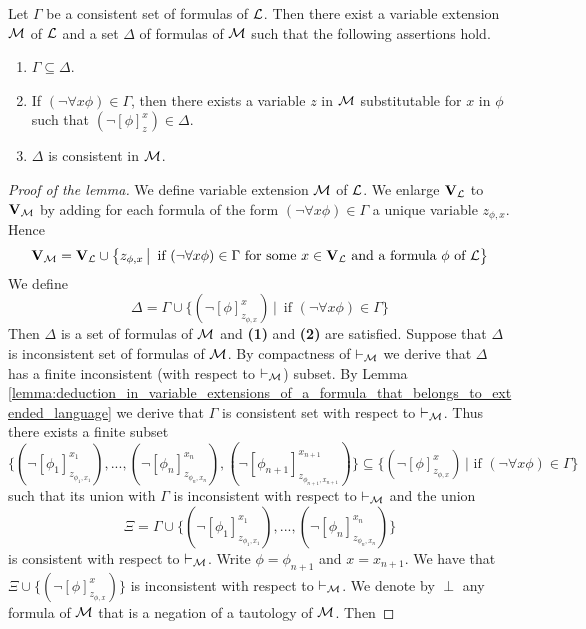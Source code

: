 \begin{lemma}\label{lemma:superconsistent_extension}
Let $\Gamma$ be a consistent set of formulas of ${\mathcal L}$. Then there exist a variable extension ${\mathcal M}$ of ${\mathcal L}$ and a set $\Delta$ of formulas of ${\mathcal M}$ such that the following assertions hold.
\begin{enumerate}[label=\emph{\textbf{(\arabic*)}}, leftmargin=3.0em]
\item $\Gamma \subseteq \Delta$.
\item If $(\neg\forall x\phi) \in \Gamma$, then there exists a variable $z$ in ${\mathcal M}$ substitutable for $x$ in $\phi$ such that $(\neg[\phi]^x_z) \in \Delta$.
\item $\Delta$ is consistent in ${\mathcal M}$.
\end{enumerate}
\end{lemma}
\begin{proof}[Proof of the lemma]
We define variable extension ${\mathcal M}$ of ${\mathcal L}$. We enlarge $\mathbf{V}_{{\mathcal L}}$ to $\mathbf{V}_{{\mathcal M}}$ by adding for each formula of the form $(\neg\forall x\phi) \in \Gamma$ a unique variable $z_{\phi,x}$. Hence
$$\mathbf{V}_{{\mathcal M}} = \mathbf{V}_{{\mathcal L}} \cup \big\{z_{\phi,x}\,\big|\,\mbox{ if }(\neg\forall x\phi) \in \Gamma\mbox{ for some }x \in \mathbf{V}_{{\mathcal L}}\mbox{ and a formula }\phi\mbox{ of }{\mathcal L}\big\}$$
We define
$$\Delta = \Gamma \cup \big\{(\neg[\phi]^x_{z_{\phi,x}})\,\big|\,\mbox{ if $(\neg\forall x\phi) \in \Gamma$}\big\}$$
Then $\Delta$ is a set of formulas of ${\mathcal M}$ and \textbf{(1)} and \textbf{(2)} are satisfied. Suppose that $\Delta$ is inconsistent set of formulas of ${\mathcal M}$. By compactness of $\vdash_{{\mathcal M}}$ we derive that $\Delta$ has a finite inconsistent (with respect to $\vdash_{{\mathcal M}}$) subset. By Lemma \ref{lemma:deduction_in_variable_extensions_of_a_formula_that_belongs_to_extended_language} we derive that $\Gamma$ is consistent set with respect to $\vdash_{{\mathcal M}}$. Thus there exists a finite subset $$\bigg\{\left(\neg[\phi_1]^{x_1}_{z_{\phi_1,x_1}}\right),...,\left(\neg[\phi_n]^{x_n}_{z_{\phi_n,x_n}}\right),\left(\neg[\phi_{n+1}]^{x_{n+1}}_{z_{\phi_{n+1},x_{n+1}}}\right)\bigg\} \subseteq \bigg\{\left(\neg[\phi]^x_{z_{\phi,x}}\right)\,\bigg| \mbox{ if } \left(\neg\forall x\phi\right) \in \Gamma\bigg\}$$
such that its union with $\Gamma$ is inconsistent with respect to $\vdash_{{\mathcal M}}$ and the union
$$\Xi = \Gamma \cup \bigg\{\left(\neg[\phi_1]^{x_1}_{z_{\phi_1,x_1}}\right),...,\left(\neg[\phi_n]^{x_n}_{z_{\phi_n,x_n}}\right)\bigg\}$$
is consistent with respect to $\vdash_{{\mathcal M}}$. Write $\phi = \phi_{n+1}$ and $x = x_{n+1}$. We have that $\Xi \cup \bigg\{\left(\neg[\phi]^x_{z_{\phi,x}}\right)\bigg\}$ is inconsistent with respect to $\vdash_{{\mathcal M}}$. We denote by $\perp$ any formula of ${\mathcal M}$ that is a negation of a tautology of ${\mathcal M}$. Then

\end{proof}
